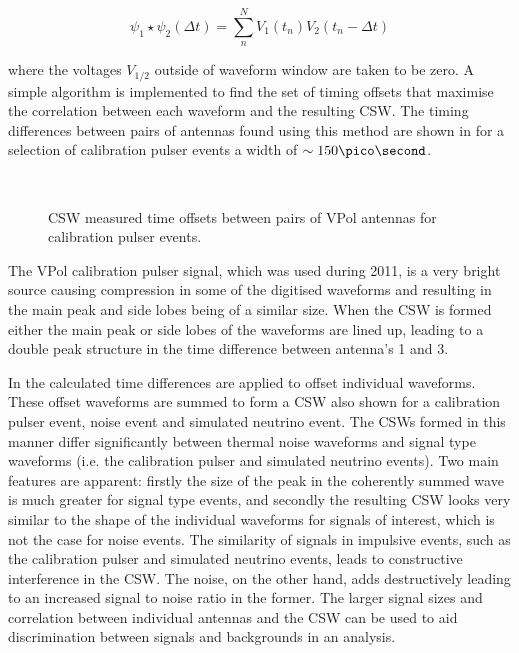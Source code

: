 \begin{equation}
  \psi_{1} \star \psi_{2} (\Delta t) = \sum_{n}^{N} V_{1}(t_{n}) V_{2}(t_{n}-\Delta t)
  \label{eq:analysis:Reconstruction:Discrete-Cross-Correlation}
\end{equation}

\noindent where the voltages $V_{1/2}$ outside of waveform window are taken to be zero. A simple algorithm is implemented to find the set of timing offsets that maximise the correlation between each waveform and the resulting CSW. The timing differences between pairs of antennas found using this method are shown in  for a selection of calibration pulser events a width of $\sim 150 \pico \second$. 

\begin{figure}[htpb]
  \hfill
  \\
  \hfill
  \caption{CSW measured time offsets between pairs of VPol antennas for calibration pulser events.}
  \label{fig:analysis:Reconstruction:CSW-DeltaT}
\end{figure}


The VPol calibration pulser signal, which was used during 2011, is a very bright source causing compression in some of the digitised waveforms and resulting in the main peak and side lobes being of a similar size. When the CSW is formed either the main peak or side lobes of the waveforms are lined up, leading to a double peak structure in the time difference between antenna's 1 and 3. 

In  the calculated time differences are applied to offset individual waveforms. These offset waveforms are summed to form a CSW also shown for a calibration pulser event, noise event and simulated neutrino event. The CSWs formed in this manner differ significantly between thermal noise waveforms and signal type waveforms (i.e. the calibration pulser and simulated neutrino events). Two main features are apparent: firstly the size of the peak in the coherently summed wave is much greater for signal type events, and secondly the resulting CSW looks very similar to the shape of the individual waveforms for signals of interest, which is not the case for noise events. The similarity of signals in impulsive events, such as the calibration pulser and simulated neutrino events, leads to constructive interference in the CSW. The noise, on the other hand, adds destructively leading to an increased  signal to noise ratio in the former. The larger signal sizes and correlation between individual antennas and the CSW can be used to aid discrimination between signals and backgrounds in an analysis.


